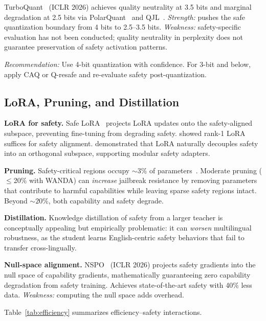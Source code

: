 \documentclass[12pt,a4paper]{article}
\begin{document}
TurboQuant~\citep{zandieh2025turboquant} (ICLR 2026) achieves quality neutrality at 3.5 bits and marginal degradation at 2.5 bits via PolarQuant~\citep{zandieh2026polarquant} and QJL~\citep{zandieh2024qjl}. \emph{Strength:} pushes the safe quantization boundary from 4 bits to 2.5--3.5 bits. \emph{Weakness:} safety-specific evaluation has not been conducted; quality neutrality in perplexity does not guarantee preservation of safety activation patterns.

\emph{Recommendation:} Use 4-bit quantization with confidence. For 3-bit and below, apply CAQ or Q-resafe and re-evaluate safety post-quantization.

\subsection{LoRA, Pruning, and Distillation}

\textbf{LoRA for safety.} Safe LoRA~\citep{hsu2024safelora} projects LoRA updates onto the safety-aligned subspace, preventing fine-tuning from degrading safety. \citet{xue2025lora} showed rank-1 LoRA suffices for safety alignment. \citet{mou2025decoupling} demonstrated that LoRA naturally decouples safety into an orthogonal subspace, supporting modular safety adapters.

\textbf{Pruning.} Safety-critical regions occupy ${\sim}3\%$ of parameters~\citep{wei2024brittleness}. Moderate pruning ($\leq$20\% with WANDA) can \emph{increase} jailbreak resistance by removing parameters that contribute to harmful capabilities while leaving sparse safety regions intact. Beyond ${\sim}20\%$, both capability and safety degrade.

\textbf{Distillation.} Knowledge distillation of safety from a larger teacher is conceptually appealing but empirically problematic: it can \emph{worsen} multilingual robustness, as the student learns English-centric safety behaviors that fail to transfer cross-lingually.

\textbf{Null-space alignment.} NSPO~\citep{niu2025nspo} (ICLR 2026) projects safety gradients into the null space of capability gradients, mathematically guaranteeing zero capability degradation from safety training. Achieves state-of-the-art safety with 40\% less data. \emph{Weakness:} computing the null space adds overhead.

Table~\ref{tab:efficiency} summarizes efficiency--safety interactions.
\end{document}
